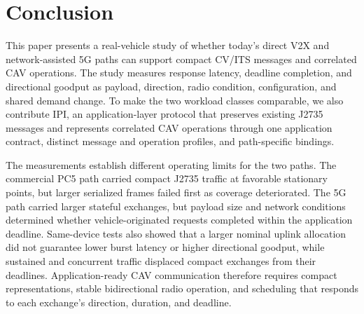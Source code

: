 \section{Conclusion}
\label{sec:conclusion}

This paper presents a real-vehicle study of whether today's direct V2X and
network-assisted 5G paths can support compact CV/ITS
messages and correlated CAV operations. The study measures response latency,
deadline completion, and directional goodput as payload, direction, radio
condition, configuration, and shared demand change. To make the two workload
classes comparable, we also contribute IPI, an application-layer protocol that
preserves existing J2735 messages and represents correlated CAV operations
through one application contract, distinct message and operation profiles, and
path-specific bindings.

The measurements establish different operating limits for the two paths. The
commercial PC5 path carried compact J2735 traffic at favorable stationary
points, but larger serialized frames failed first as coverage deteriorated. The
5G path carried larger stateful exchanges, but payload size and network
conditions determined whether vehicle-originated requests completed within the
application deadline. Same-device tests also showed that a
larger nominal uplink allocation did not guarantee lower burst latency or higher
directional goodput, while sustained and concurrent traffic displaced compact
exchanges from their deadlines. Application-ready CAV communication therefore
requires compact representations, stable bidirectional radio operation, and
scheduling that responds to each exchange's direction, duration, and deadline.
